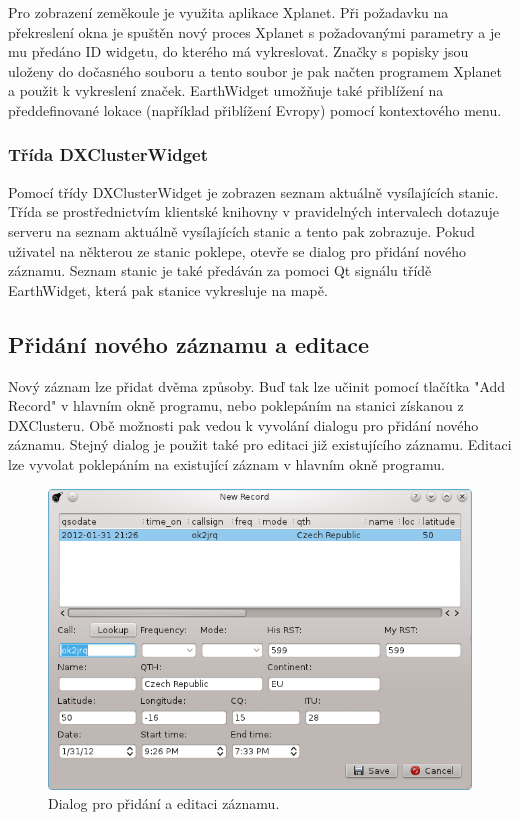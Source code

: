 Pro zobrazení zeměkoule je využita aplikace Xplanet. Při požadavku na překreslení okna je spuštěn nový proces Xplanet
s požadovanými parametry a je mu předáno ID widgetu, do kterého má vykreslovat. Značky s popisky jsou uloženy do dočasného souboru
a tento soubor je pak načten programem Xplanet a použit k vykreslení značek.
EarthWidget umožňuje také přiblížení na předdefinované lokace (například přiblížení Evropy) pomocí kontextového menu.

\subsubsection{Třída DXClusterWidget}

Pomocí třídy DXClusterWidget je zobrazen seznam aktuálně vysílajících stanic. Třída se prostřednictvím klientské knihovny
v pravidelných intervalech dotazuje
serveru na seznam aktuálně vysílajících stanic a tento pak zobrazuje. Pokud uživatel na některou ze stanic poklepe, otevře se 
dialog pro přidání nového záznamu. Seznam stanic je také předáván za pomoci Qt signálu třídě EarthWidget, která pak stanice
vykresluje na mapě.

\subsection{Přidání nového záznamu a editace}

Nový záznam lze přidat dvěma způsoby. Buď tak lze učinit pomocí tlačítka "Add Record" v hlavním okně programu, nebo poklepáním
na stanici získanou z DXClusteru. Obě možnosti pak vedou k vyvolání dialogu pro přidání nového záznamu. Stejný dialog je použit
také pro editaci již existujícího záznamu. Editaci lze vyvolat poklepáním na existující záznam v hlavním okně programu.

\begin{figure}[h]
\centering
\includegraphics[trim=0cm 0cm 0cm 0cm, scale=0.9]{fig/ham4}
\caption{Dialog pro přidání a editaci záznamu.}
\label{fig:FigureExample}
\end{figure}

